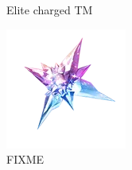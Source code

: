 \begin{figure}[h]
\begin{minipage}[t]{0.3\textwidth}
\begin{center}
    \end{center}
    \caption*{Elite charged TM}
    \label{fig:elitechargedtm}
  \end{minipage}
  \begin{minipage}[t]{0.3\textwidth}
    \begin{center}
    \includegraphics[width=\textwidth]{images/starpiece.png}
    \end{center}
    \caption*{FIXME}
    \label{fig:FIXME}
  \end{minipage}
\end{figure}

